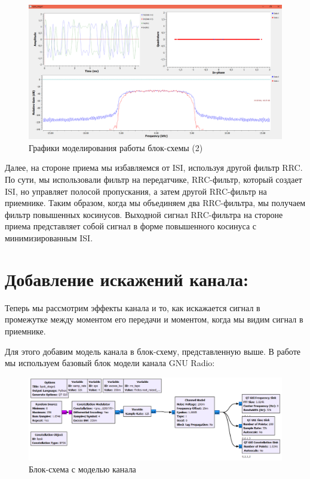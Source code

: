 \documentclass[12pt]{article}
\begin{document}
\begin{figure}[H]
    \centering
    \includegraphics[width=1\textwidth]{pics/a0000-img003.png}
    \caption{Графики моделирования работы блок-схемы (2)}
\end{figure}

Далее, на стороне приема мы избавляемся от ISI, используя другой фильтр RRC. По сути, мы использовали фильтр на передатчике, RRC-фильтр, который создает ISI, но управляет полосой пропускания, а затем другой RRC-фильтр на приемнике. Таким образом, когда мы объединяем два RRC-фильтра, мы получаем фильтр повышенных косинусов. Выходной сигнал RRC-фильтра на стороне приема представляет собой сигнал в форме повышенного косинуса с минимизированным ISI.

\section{Добавление искажений канала:}

Теперь мы рассмотрим эффекты канала и то, как искажается сигнал в промежутке между моментом его передачи и моментом, когда мы видим сигнал в приемнике. 

Для этого добавим модель канала в блок-схему, представленную выше. В работе мы используем базовый блок модели канала GNU Radio: 

\begin{figure}[H]
    \centering
    \includegraphics[width=1\textwidth]{pics/a0000-img004.png}
    \caption{Блок-схема с моделью канала}
\end{figure}
\end{document}
